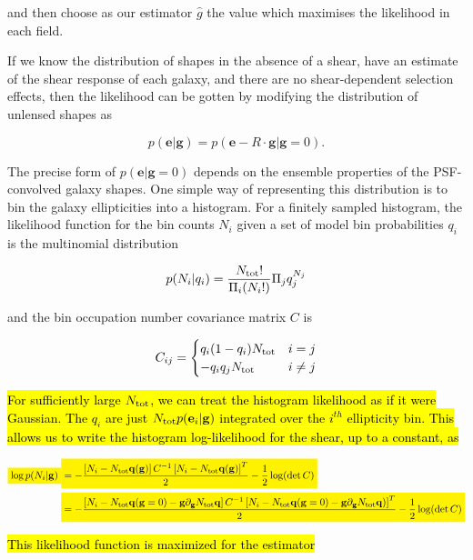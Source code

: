 \documentclass[iop]{emulateapj}
\newcommand{\mathcolorbox}[2]{\colorbox{#1}{$\displaystyle #2$}}
\begin{document}
and then choose as our estimator $\hat{g}$ the value which
maximises the likelihood in each field.

If we know the distribution of shapes in the absence of a shear, have
an estimate of the shear response of each galaxy, and there are no
shear-dependent selection effects, then the likelihood can be gotten
by modifying the distribution of unlensed shapes as

\begin{equation}
p(\mathbf{e}|\mathbf{g}) = p(\mathbf{e}-R\cdot\mathbf{g} | \mathbf{g}=0).
\end{equation}


The precise form of $p(\mathbf{e}|\mathbf{g}=0)$ depends on the ensemble properties
of the PSF-convolved galaxy shapes. One simple way of representing this
distribution is to bin the galaxy ellipticities into a histogram. For
a finitely sampled histogram, the likelihood function for the bin
counts $N_i$ given a set of model bin probabilities $q_i$ is the
multinomial distribution

\begin{equation}
p( N_i | q_i) = \frac{N_{\rm tot} !}{\Pi_i (N_i!)}\Pi_j q^{N_j}_j
\end{equation}

and the bin occupation number covariance matrix $C$ is

\begin{equation}
C_{ij}= \begin{cases}
q_i ( 1 - q_i) N_{\rm tot} &  i=j\\
-q_i q_j N_{\rm tot} &  i \ne j
\end{cases}
\end{equation}

\hl{For sufficiently large $N_{\rm tot}$, we can treat the histogram likelihood as
if it were Gaussian. The $q_i$ are just $N_{\rm tot} p(\mathbf{e}_i|\mathbf{g})$
integrated over the $i^{th}$ ellipticity bin. This allows us to
write the histogram log-likelihood for the shear, up to a constant, as}

\begin{widetext}
\begin{align}
\mathcolorbox{yellow}{  \log p(N_i | \mathbf{g} )} & \mathcolorbox{yellow}{= -\frac{\left[N_i - N_{\rm tot} \mathbf{q} (\mathbf{g})
                              \right]C^{-1} \left[N_i - N_{\rm tot} \mathbf{q}
                              (\mathbf{g}) \right]^T}{2} -
                              \frac{1}{2}\log(\det{}C)} \\ \nonumber
                            &\mathcolorbox{yellow}{ = -\frac{\left[N_i - N_{\rm tot} \mathbf{q} (\mathbf{g}=0) - \mathbf{g} \partial_\mathbf{g}
                              N_{\rm tot} \mathbf{q} \right]C^{-1} \left[N_i - N_{\rm tot} \mathbf{q} (\mathbf{g}=0) -
                              \mathbf{g} \partial_\mathbf{g} N_{\rm tot}
                              \mathbf{q}) \right]^T}{2} -\frac{1}{2}\log(\det{}C)}
\end{align}

\end{widetext}
\hl{This likelihood function is maximized for the estimator}
\end{document}
